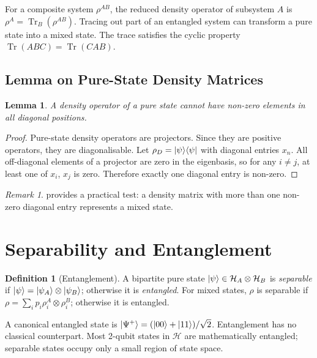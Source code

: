 \documentclass[12pt, a4paper, oneside]{report}
\theoremstyle{plain}
\newtheorem{lemma}[theorem]{Lemma}
\theoremstyle{definition}
\newtheorem{definition}[theorem]{Definition}
\theoremstyle{remark}
\newtheorem{remark}[theorem]{Remark}
\newcommand{\oket}[2]{\ket{#1}\!\bra{#2}}
\DeclareMathOperator{\Tr}{Tr}
\newcommand{\Hcal}{\mathcal{H}}
\begin{document}
For a composite system $\rho^{AB}$, the reduced density operator of subsystem $A$ is
$\rho^A = \Tr_B(\rho^{AB})$. Tracing out part of an entangled system can transform a pure
state into a mixed state. The trace satisfies the cyclic property $\Tr(ABC) = \Tr(CAB)$.

\subsection{Lemma on Pure-State Density Matrices}

\begin{lemma}
\label{lem:puredensity}
A density operator of a pure state cannot have non-zero elements in all diagonal positions.
\end{lemma}

\begin{proof}
Pure-state density operators are projectors. Since they are positive operators, they are
diagonalisable. Let $\rho_D = \oket{\psi}{\psi}$ with diagonal entries $x_n$. All
off-diagonal elements of a projector are zero in the eigenbasis, so for any $i \neq j$,
at least one of $x_i$, $x_j$ is zero. Therefore exactly one diagonal entry is non-zero.
\end{proof}

\begin{remark}
 provides a practical test: a density matrix with more than one
non-zero diagonal entry represents a mixed state.
\end{remark}



\section{Separability and Entanglement}

\begin{definition}[Entanglement]
A bipartite pure state $\ket{\psi} \in \Hcal_A \otimes \Hcal_B$ is \emph{separable} if
$\ket{\psi} = \ket{\psi_A} \otimes \ket{\psi_B}$; otherwise it is \emph{entangled}. For
mixed states, $\rho$ is separable if $\rho = \sum_i p_i \rho_i^A \otimes \rho_i^B$;
otherwise it is entangled.
\end{definition}

A canonical entangled state is $\ket{\Psi^+} = (\ket{00}+\ket{11})/\sqrt{2}$. Entanglement
has no classical counterpart. Most 2-qubit states in $\Hcal$ are mathematically entangled;
separable states occupy only a small region of state space.
\end{document}
